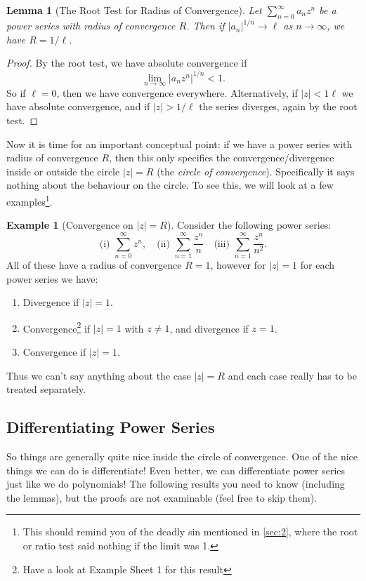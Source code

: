 \documentclass[11pt, a4paper]{article}
\newtheorem{lemma}[theorem]{Lemma}
\theoremstyle{definition}
\newtheorem{example}[theorem]{Example}
\begin{document}
\begin{lemma}[The Root Test for Radius of Convergence]
	Let $\sum_{n = 0}^{\infty} a_n z^n$ be a power series with radius of convergence $R$.
	Then if $|a_{n}|^{1/n} \rightarrow \ell$ as $n \rightarrow \infty$, we have $R = 1/\ell$.
\end{lemma}
\begin{proof}
	By the root test, we have absolute convergence if
	$$
	\lim_{n \to \infty} |a_n z^n|^{1/n} < 1.
	$$
	So if $\ell = 0$, then we have convergence everywhere. Alternatively, if $|z| < 1\ell$ we have absolute convergence, and if $|z| > 1/\ell$ the series diverges, again by the root test.
\end{proof}

Now it is time for an important conceptual point: if we have a power series with radius of convergence $R$, then this only specifies the convergence/divergence inside or outside the circle $|z| = R$ (the \emph{circle of convergence}). Specifically {\color{red} it says nothing about the behaviour on the circle.} To see this, we will look at a few examples\footnote{This should remind you of the deadly sin mentioned in \autoref{sec:2}, where the root or ratio test said nothing if the limit was 1.}.

\begin{example}[Convergence on $|z| = R$]
	Consider the following power series:
	$$
	\text{(i) }\sum_{n = 0}^{\infty} z^n, \quad \text{(ii) }\sum_{n = 1}^\infty \frac{z^n}{n}\quad \text{(iii) }\sum_{n = 1}^\infty \frac{z^n}{n^2}.
	$$
	All of these have a radius of convergence $R = 1$, however for $|z| = 1$ for each power series we have:
	\begin{enumerate}
		\item Divergence if $|z| = 1$.
		\item Convergence\footnote{Have a look at Example Sheet 1 for this result} if $|z| = 1$ with $z \neq 1$, and divergence if $z = 1$.
		\item Convergence if $|z| = 1$.
	\end{enumerate}
	Thus we can't say anything about the case $|z| = R$ and each case really has to be treated separately.
\end{example}

\subsection{Differentiating Power Series}

So things are generally quite nice inside the circle of convergence. One of the nice things we can do is differentiate! Even better, we can differentiate power series just like we do polynomials!
The following results you need to know (including the lemmas), but the proofs are not examinable (feel free to skip them).
\end{document}
